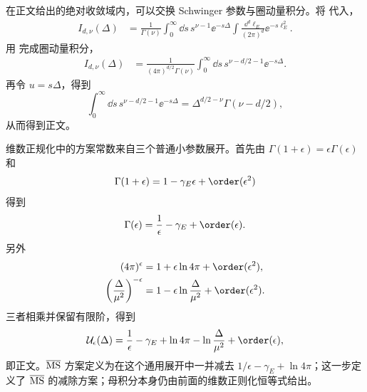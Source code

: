 \begin{derivation}
在正文给出的绝对收敛域内，可以交换 Schwinger 参数与圈动量积分。将 代入，
\begin{align*}
 I_{d,\nu}(\Delta)
 &=\frac1{\Gamma(\nu)}
 \int_0^\infty\dd s\,s^{\nu-1}\ee^{-s\Delta}
 \int\frac{\dd^d \ell_E}{(2\pi)^d}\ee^{-s\ell_E^2}.
\end{align*}
用 完成圈动量积分，
\begin{align*}
 I_{d,\nu}(\Delta)
 &=\frac1{(4\pi)^{d/2}\Gamma(\nu)}
 \int_0^\infty\dd s\,
 s^{\nu-d/2-1}\ee^{-s\Delta}.
\end{align*}
再令 $u=s\Delta$，得到
\begin{equation*}
 \int_0^\infty\dd s\,s^{\nu-d/2-1}\ee^{-s\Delta}
 =\Delta^{d/2-\nu}\Gamma(\nu-d/2),
\end{equation*}
从而得到正文。
\end{derivation}



\begin{derivation}
维数正规化中的方案常数来自三个普通小参数展开。首先由 $\Gamma(1+\epsilon)=\epsilon\Gamma(\epsilon)$ 和
\begin{equation*}
 \Gamma(1+\epsilon)=1-\gamma_E\epsilon+\order(\epsilon^2)
\end{equation*}
得到
\begin{equation*}
 \Gamma(\epsilon)=\frac1\epsilon-\gamma_E+\order(\epsilon).
\end{equation*}
另外
\begin{align*}
 (4\pi)^\epsilon
 &=1+\epsilon\ln4\pi+\order(\epsilon^2),\\
 \left(\frac{\Delta}{\mu^2}\right)^{-\epsilon}
 &=1-\epsilon\ln\frac{\Delta}{\mu^2}+\order(\epsilon^2).
\end{align*}
三者相乘并保留有限阶，得到
\begin{equation*}
 \mathcal U_\epsilon(\Delta)
 =\frac1\epsilon-\gamma_E+\ln4\pi
 -\ln\frac{\Delta}{\mu^2}+\order(\epsilon),
\end{equation*}
即正文。$\overline{\rm MS}$ 方案定义为在这个通用展开中一并减去 $1/\epsilon-\gamma_E+\ln4\pi$；这一步定义了 $\overline{\rm MS}$ 的减除方案；母积分本身仍由前面的维数正则化恒等式给出。
\end{derivation}
